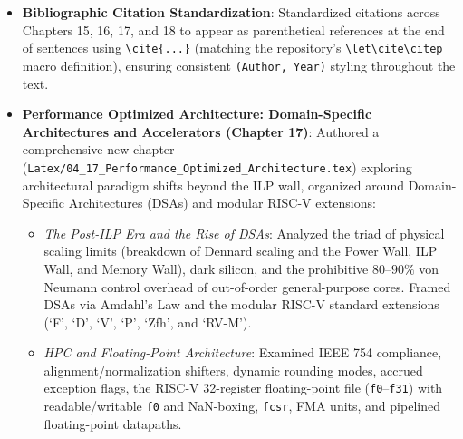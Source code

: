 \begin{itemize}
\begin{itemize}
        \item \textit{Virtual Memory and Associative CAM-Based TLBs (Section 16.7.4)}: Covered virtual page translation, page tables, and demand paging (Figure \ref{vmm}). Contrasted flat RAM-based page translation ($O(n \times (\log m + \log n))$ area, $(m/n)\%$ utilization) with associative Content-Addressable Memory (CAM) Translation Lookaside Buffers ($O(m \times (\log m + \log n))$ area), proving an area reduction factor in $O(n/m)$. Provided a structural comparison table between hardware caches and virtual memory paging.
        \item \textit{Analytical Practice Problems with Worked Solutions}: Relocated the CAM-based page translator design problem from Chapter 12 to Section 16.8 (Problem 16.8) with a complete mathematical solution demonstrating a $352\times$ memory savings, and added Problem 16.9 analyzing multi-level cache AMAT, tag/index/offset bit breakdowns, and pipeline CPI degradation under memory stalls.
    \end{itemize}
    \item \textbf{Bibliographic Citation Standardization}: Standardized citations across Chapters 15, 16, 17, and 18 to appear as parenthetical references at the end of sentences using \texttt{\textbackslash cite\{...\}} (matching the repository's \texttt{\textbackslash let\textbackslash cite\textbackslash citep} macro definition), ensuring consistent \texttt{(Author, Year)} styling throughout the text.
    \item \textbf{Performance Optimized Architecture: Domain-Specific Architectures and Accelerators (Chapter 17)}: Authored a comprehensive new chapter (\texttt{Latex/04\_17\_Performance\_Optimized\_Architecture.tex}) exploring architectural paradigm shifts beyond the ILP wall, organized around Domain-Specific Architectures (DSAs) and modular RISC-V extensions:
    \begin{itemize}
        \item \textit{The Post-ILP Era and the Rise of DSAs}: Analyzed the triad of physical scaling limits (breakdown of Dennard scaling and the Power Wall, ILP Wall, and Memory Wall), dark silicon, and the prohibitive $80\text{--}90\%$ von Neumann control overhead of out-of-order general-purpose cores. Framed DSAs via Amdahl's Law and the modular RISC-V standard extensions (`F', `D', `V', `P', `Zfh', and `RV-M').
        \item \textit{HPC and Floating-Point Architecture}: Examined IEEE 754 compliance, alignment/normalization shifters, dynamic rounding modes, accrued exception flags, the RISC-V 32-register floating-point file (\texttt{f0}--\texttt{f31}) with readable/writable \texttt{f0} and NaN-boxing, \texttt{fcsr}, FMA units, and pipelined floating-point datapaths.

\end{itemize}
\end{itemize}
